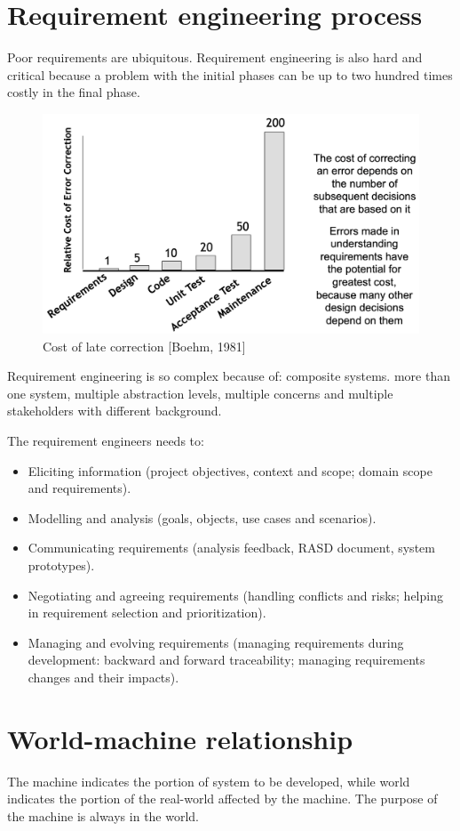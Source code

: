 \documentclass[12pt, a4paper]{report}
\newtheorem[style=M,bodystyle=\normalfont]{theorem}{Theorem}
\newtheorem[style=M,bodystyle=\normalfont]{corollary}{Corollary}
\newtheorem[style=M,bodystyle=\normalfont]{lemma}{Lemma}
\newtheorem[style=M,bodystyle=\normalfont]{definition}{Definition}
\begin{document}
    \section{Requirement engineering process}
    Poor requirements are ubiquitous. Requirement engineering is also hard and critical because a problem with the initial phases can be up to two hundred times costly in the final 
    phase. 
    \begin{figure}[H]
        \centering
        \includegraphics[width=0.75\linewidth]{images/requirements.png}
        \caption{Cost of late correction [Boehm, 1981]}
    \end{figure}
    Requirement engineering is so complex because of: composite systems. more than one system, multiple abstraction levels, multiple concerns and multiple stakeholders with different
    background.
    
    The requirement engineers needs to: 
    \begin{itemize}
        \item Eliciting information (project objectives, context and scope; domain scope and requirements).
        \item Modelling and analysis (goals, objects, use cases and scenarios).
        \item Communicating requirements (analysis feedback, RASD document, system prototypes).
        \item Negotiating and agreeing requirements (handling conflicts and risks; helping in requirement selection and prioritization).
        \item Managing and evolving requirements (managing requirements during development: backward and forward traceability; managing requirements changes and their impacts).
    \end{itemize}

    \section{World-machine relationship}
    The machine indicates the portion of system to be developed, while world indicates the portion of the real-world affected by the machine. The purpose of the machine is always in 
    the world. 
    
\end{document}
